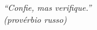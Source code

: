 \documentclass[
	12pt,				%
	oneside,			%
	a4paper,			%
	english,			%
	brazil				%
	]{abntex2ppgsi}
\begin{document}
%
% 
\begin{epigrafe}
    \vspace*{\fill}
	\begin{flushright}
		\textit{``Confie, mas verifique.''\\
		(provérbio russo)}
	\end{flushright}
\end{epigrafe}


\setlength{\absparsep}{18pt} %
\end{document}
